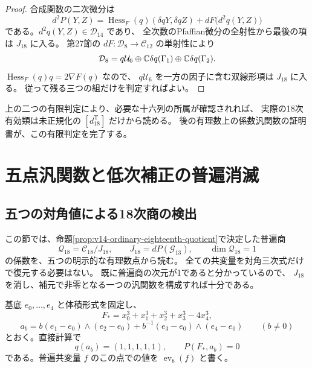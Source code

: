 \begin{proof}
合成関数の二次微分は
\[
 d^2P(Y,Z)=\operatorname{Hess}_F(q)(\delta qY,\delta qZ)
                      +dF\bigl(d^2q(Y,Z)\bigr)
\]
である。$d^2q(Y,Z)\in\mathcal D_{14}$ であり、
全次数のPfaffian微分の全射性から最後の項は $J_{18}$ に入る。
第27節の $dF:\mathcal D_8\to\mathcal C_{12}$ の単射性により
\[
 \mathcal D_8=q\mathcal U_6\oplus
       \mathbb C\delta q(\Gamma_1)\oplus\mathbb C\delta q(\Gamma_2).
\]
$\operatorname{Hess}_F(q)q=2\nabla F(q)$ なので、
$q\mathcal U_6$ を一方の因子に含む双線形項は $J_{18}$ に入る。
従って残る三つの組だけを判定すればよい。
\end{proof}

上の二つの有限判定により、必要な十六列の所属が確認されれば、
実際の18次有効類は未正規化の $[d^{\mathrm T}_{18}]$ だけから読める。
後の有理数上の係数汎関数の証明書が、この有限判定を完了する。



\section{五点汎関数と低次補正の普遍消滅}
\label{sec:v14-five-point}

\subsection{五つの対角値による18次商の検出}
\label{subsec:v14-five-point-detector}

この節では、命題\ref{prop:v14-ordinary-eighteenth-quotient}で決定した普遍商
\[
 \mathcal Q_{18}=\mathcal C_{18}/J_{18},\qquad
 J_{18}=dP(\mathcal G_{13}),\qquad
 \dim\mathcal Q_{18}=1
\]
の係数を、五つの明示的な有理数点から読む。
全ての共変量を対角三次式だけで復元する必要はない。
既に普遍商の次元が1であると分かっているので、
$J_{18}$ を消し、補元で非零となる一つの汎関数を構成すれば十分である。

基底 $e_0,\ldots,e_4$ と体積形式を固定し、
\[
 F_*=x_0^3+x_1^3+x_2^3+x_3^3-4x_4^3,
\]
\[
 a_b=b(e_1-e_0)\wedge(e_2-e_0)
       +b^{-1}(e_3-e_0)\wedge(e_4-e_0)
 \qquad (b\ne0)
\]
とおく。直接計算で
\[
 q(a_b)=(1,1,1,1,1),\qquad P(F_*,a_b)=0
\]
である。普遍共変量 $f$ のこの点での値を $\operatorname{ev}_b(f)$ と書く。

